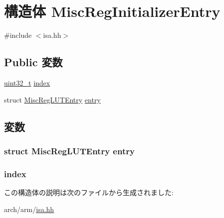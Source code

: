\hypertarget{structArmISA_1_1ISA_1_1MiscRegInitializerEntry}{
\section{構造体 MiscRegInitializerEntry}
\label{structArmISA_1_1ISA_1_1MiscRegInitializerEntry}
}


{\ttfamily \#include $<$isa.hh$>$}\subsection*{Public 変数}
\begin{DoxyCompactItemize}
\item 
\hyperlink{Type_8hh_a435d1572bf3f880d55459d9805097f62}{uint32\_\-t} \hyperlink{structArmISA_1_1ISA_1_1MiscRegInitializerEntry_aafd95f8c7a99b9189ede7cdf0871ebe8}{index}
\item 
struct \hyperlink{structArmISA_1_1ISA_1_1MiscRegLUTEntry}{MiscRegLUTEntry} \hyperlink{structArmISA_1_1ISA_1_1MiscRegInitializerEntry_a84159fd8bc410be2a74bb58420de73f9}{entry}
\end{DoxyCompactItemize}


\subsection{変数}
\hypertarget{structArmISA_1_1ISA_1_1MiscRegInitializerEntry_a84159fd8bc410be2a74bb58420de73f9}{
\subsubsection[{entry}]{\setlength{\rightskip}{0pt plus 5cm}struct {\bf MiscRegLUTEntry} {\bf entry}}}
\label{structArmISA_1_1ISA_1_1MiscRegInitializerEntry_a84159fd8bc410be2a74bb58420de73f9}
\hypertarget{structArmISA_1_1ISA_1_1MiscRegInitializerEntry_aafd95f8c7a99b9189ede7cdf0871ebe8}{
\subsubsection[{index}]{ {\bf index}}}
\label{structArmISA_1_1ISA_1_1MiscRegInitializerEntry_aafd95f8c7a99b9189ede7cdf0871ebe8}


この構造体の説明は次のファイルから生成されました:\begin{DoxyCompactItemize}
\item 
arch/arm/\hyperlink{arm_2isa_8hh}{isa.hh}\end{DoxyCompactItemize}

